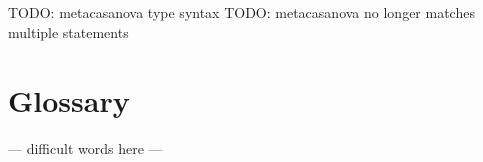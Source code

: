 \documentclass[10pt,a4paper]{article}
\begin{document}
\pagestyle{empty} 


\newpage

\setcounter{page}{1}
\pagestyle{plain}

\begin{multicols}{2}

\tableofcontents
\columnbreak




TODO: metacasanova type syntax
TODO: metacasanova no longer matches multiple statements








\setcounter{section}{0}
\renewcommand\thesection{\Alph{section}}
\section{Glossary}
--- difficult words here ---

\end{multicols}

\printbibliography
\end{document}
